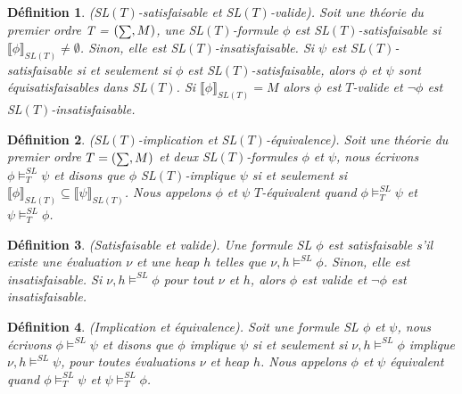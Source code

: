\documentclass[9pt,openany]{book}
\newcommand\phibra{\llbracket\phi\rrbracket}
\newcommand\psibra{\llbracket\psi\rrbracket}
\newcommand\smallsum{\mathsmaller\sum}
\newtheorem{definition}{D\'efinition}[section]
\begin{document}
\begin{definition}
(SL$(T)$-satisfaisable et SL$(T)$-valide). Soit une th\'eorie du premier ordre T = $(\smallsum,M)$, une SL$(T)$-formule $\phi$ est SL$(T)$-satisfaisable si $\phibra_{SL(T)}\neq\emptyset$. Sinon, elle est SL$(T)$-insatisfaisable. Si $\psi$ est SL$(T)$-satisfaisable si et seulement si $\phi$ est SL$(T)$-satisfaisable, alors $\phi$ et $\psi$ sont \textit{\'equisatisfaisables} dans SL$(T)$. Si $\phibra_{SL(T)}=M$ alors $\phi$ est $T$-valide et $\neg\phi$ est SL$(T)$-insatisfaisable.
\end{definition}

\begin{definition}
(SL$(T)$-implication et SL$(T)$-\'equivalence). Soit une th\'eorie du premier ordre $T=(\smallsum,M)$ et deux SL$(T)$-formules $\phi$ et $\psi$, nous \'ecrivons $\phi\models^{SL}_{T}\psi$ et disons que $\phi$ SL$(T)$-implique $\psi$ si et seulement si $\phibra_{SL(T)}\subseteq\psibra_{SL(T)}$. Nous appelons $\phi$ et $\psi$ $T$-\'equivalent quand  $\phi\models^{SL}_{T}\psi$ et $\psi\models^{SL}_{T}\phi$. 
\end{definition}

\begin{definition}
(Satisfaisable et valide). Une formule SL $\phi$ est satisfaisable s'il existe une \'evaluation $\nu$ et une heap $h$ telles que $\nu,h\models^{SL}\phi$. Sinon, elle est \textit{insatisfaisable}. Si $\nu,h\models^{SL}\phi$ pour tout $\nu$ et $h$, alors $\phi$ est valide et $\neg\phi$ est insatisfaisable.
\end{definition}

\begin{definition}
(Implication et \'equivalence). Soit une formule SL $\phi$ et $\psi$, nous \'ecrivons $\phi\models^{SL}\psi$ et disons que $\phi$ implique $\psi$ si et seulement si $\nu,h\models^{SL}\phi$ implique $\nu,h\models^{SL}\psi$, pour toutes \'evaluations $\nu$ et heap $h$. Nous appelons $\phi$ et $\psi$ \'equivalent quand $\phi\models^{SL}_{T}\psi$ et $\psi\models^{SL}_{T}\phi$. 
\end{definition}
\end{document}
